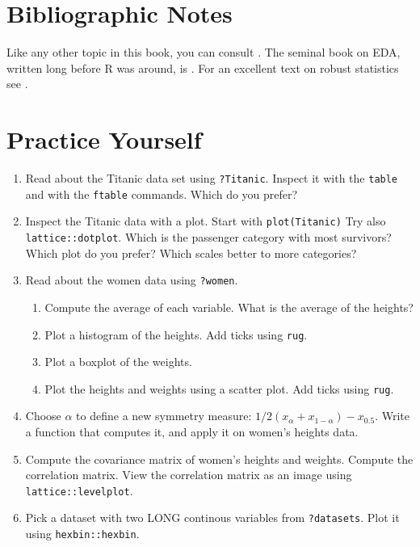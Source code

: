 \documentclass[]{book}
\providecommand{\tightlist}{%
  \setlength{\itemsep}{0pt}\setlength{\parskip}{0pt}}
\theoremstyle{definition}
\theoremstyle{definition}
\theoremstyle{definition}
\theoremstyle{remark}
\begin{document}
\section{Bibliographic Notes}\label{bibliographic-notes-3}

Like any other topic in this book, you can consult
\citet{venables2013modern}. The seminal book on EDA, written long before
R was around, is \citet{tukey1977exploratory}. For an excellent text on
robust statistics see \citet{wilcox2011introduction}.

\section{Practice Yourself}\label{practice-yourself-2}

\begin{enumerate}
\def\labelenumi{\arabic{enumi}.}
\item
  Read about the Titanic data set using \texttt{?Titanic}. Inspect it
  with the \texttt{table} and with the \texttt{ftable} commands. Which
  do you prefer?
\item
  Inspect the Titanic data with a plot. Start with
  \texttt{plot(Titanic)} Try also \texttt{lattice::dotplot}. Which is
  the passenger category with most survivors? Which plot do you prefer?
  Which scales better to more categories?
\item
  Read about the women data using \texttt{?women}.

  \begin{enumerate}
  \def\labelenumii{\arabic{enumii}.}
  \tightlist
  \item
    Compute the average of each variable. What is the average of the
    heights?
  \item
    Plot a histogram of the heights. Add ticks using \texttt{rug}.
  \item
    Plot a boxplot of the weights.
  \item
    Plot the heights and weights using a scatter plot. Add ticks using
    \texttt{rug}.
  \end{enumerate}
\item
  Choose \(\alpha\) to define a new symmetry measure:
  \(1/2(x_\alpha+x_{1-\alpha})-x_{0.5}\). Write a function that computes
  it, and apply it on women's heights data.
\item
  Compute the covariance matrix of women's heights and weights. Compute
  the correlation matrix. View the correlation matrix as an image using
  \texttt{lattice::levelplot}.
\item
  Pick a dataset with two LONG continous variables from
  \texttt{?datasets}. Plot it using \texttt{hexbin::hexbin}.
\end{enumerate}
\end{document}
